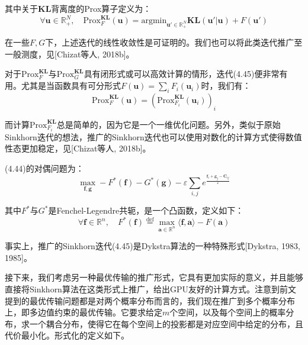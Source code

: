\documentclass[cn,10pt,math=newtx,citestyle=gb7714-2015,bibstyle=gb7714-2015]{elegantbook}
\begin{document}
其中关于$\mathbf{KL}$背离度的Prox算子定义为：
\begin{equation}
    \label{4.46}
    \forall \mathbf{u}\in\mathbb{R}_+^N, \quad \text{Prox}_F^{\mathbf{KL}}(\mathbf{u}) = \text{argmin}_{\mathbf{u'}\in\mathbb{R}_+^N} \mathbf{KL(u'|u)} + F(\mathbf{u}')
\end{equation}

在一些$F,G$下，上述迭代的线性收敛性是可证明的。我们也可以将此类迭代推广至一般测度，见[Chizat等人, 2018b]。

对于$\text{Prox}_F^{\mathbf{KL}}$与$\text{Prox}_G^{\mathbf{KL}}$具有闭形式或可以高效计算的情形，迭代(4.45)便非常有用。尤其是当函数具有可分形式$F(\mathbf{u})=\sum_i F_i(\mathbf{u}_i)$时，我们有：
\begin{equation*}
    \text{Prox}_F^{\mathbf{KL}}(\mathbf{u}) = \left( \text{Prox}_{F_i}^{\mathbf{KL}}(\mathbf{u}_i) \right)_i
\end{equation*}

而计算$\text{Prox}_{F_i}^{\mathbf{KL}}$总是简单的，因为它是一个一维优化问题。另外，类似于原始Sinkhorn迭代的想法，推广的Sinkhorn迭代也可以使用对数化的计算方式使得数值性态更加稳定，见[Chizat等人, 2018b]。

\begin{postulate}[对偶问题与勒让德变换]
(4.44)的对偶问题为：
\begin{equation}
    \label{4.47}
    \max_{\mathbf{f,g}} -F^*(\mathbf{f}) - G^*(\mathbf{g}) - \varepsilon \sum_{i,j} e^{\frac{\mathbf{f}_i+\mathbf{g}_j-\mathbf{C}_{ij}}{\varepsilon}}
\end{equation}

其中$F^*$与$G^*$是Fenchel-Legendre共轭，是一个凸函数，定义如下：
\begin{equation}
    \label{4.48}
    \forall \mathbf{f}\in\mathbb{R}^n, \quad F^*(\mathbf{f})\overset{\text{def}}{=} \max_{\mathbf{a}\in\mathbb{R}^n} \langle \mathbf{f,a} \rangle - F(\mathbf{a})
\end{equation}

事实上，推广的Sinkhorn迭代(4.45)是Dykstra算法的一种特殊形式[Dykstra, 1983, 1985]。
\end{postulate}

接下来，我们考虑另一种最优传输的推广形式，它具有更加实际的意义，并且能够直接将Sinkhorn算法在这类形式上推广，给出GPU友好的计算方式。注意到前文提到的最优传输问题都是对两个概率分布而言的，我们现在推广到多个概率分布上，即多边值约束的最优传输。它要求给定$m$个空间，以及每个空间上的概率分布，求一个耦合分布，使得它在每个空间上的投影都是对应空间中给定的分布，且代价最小化。形式化的定义如下。
\end{document}
